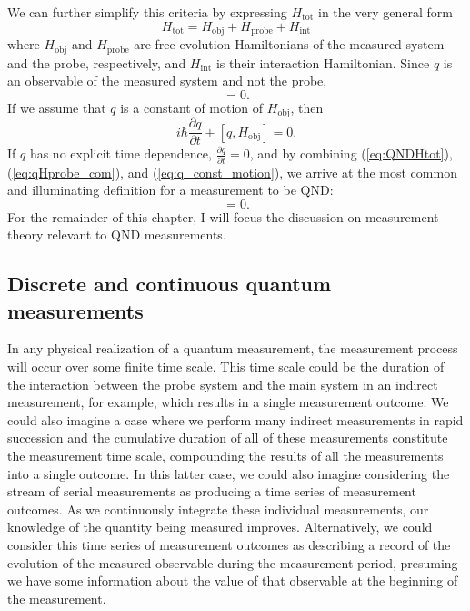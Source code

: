 We can further simplify this criteria by expressing $H_{\textrm{tot}}$ in the very general form
\begin{equation}
H_{\textrm{tot}} = H_{\textrm{obj}} + H_{\textrm{probe}} + H_{\textrm{int}}
\label{eq:Htot}
\end{equation}
where $H_{\textrm{obj}}$ and $H_{\textrm{probe}}$ are free evolution Hamiltonians of the measured system and the probe, respectively, and $H_{\textrm{int}}$ is their interaction Hamiltonian.  Since $q$ is an observable of the measured system and not the probe,
\begin{equation}
[q,H_{\textrm{probe}}] = 0.
\label{eq:qHprobe_com}
\end{equation}
If we assume that $q$ is a constant of motion of $H_{\textrm{obj}}$, then
\begin{equation}
i \hbar \frac{\partial q}{\partial t} +  [q,H_{\textrm{obj}}] = 0.
\label{eq:q_const_motion}
\end{equation}
If $q$ has no explicit time dependence, $\frac{\partial q}{\partial t} = 0$, and by combining (\ref{eq:QNDHtot}), (\ref{eq:qHprobe_com}), and (\ref{eq:q_const_motion}), we arrive at the most common and illuminating definition for a measurement to be QND:
\begin{equation}
[q,H_{\textrm{int}}] = 0.
\label{eq:QND_cond}
\end{equation}
For the remainder of this chapter, I will focus the discussion on measurement theory relevant to QND measurements.

\subsection{Discrete and continuous quantum measurements}

In any physical realization of a quantum measurement, the measurement process will occur over some finite time scale.  This time scale could be the duration of the interaction between the probe system and the main system in an indirect measurement, for example, which results in a single measurement outcome.  We could also imagine a case where we perform many indirect measurements in rapid succession and the cumulative duration of all of these measurements constitute the measurement time scale, compounding the results of all the measurements into a single outcome.  In this latter case, we could also imagine considering the stream of serial measurements as producing a time series of measurement outcomes.  As we continuously integrate these individual measurements, our knowledge of the quantity being measured improves.  Alternatively, we could consider this time series of measurement outcomes as describing a record of the evolution of the measured observable during the measurement period, presuming we have some information about the value of that observable at the beginning of the measurement.

